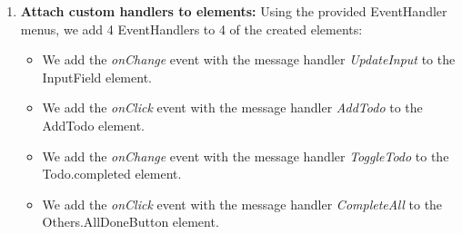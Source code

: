 \begin{enumerate}
\begin{itemize}
\begin{listing}[!htbp]
	\begin{lstlisting}
if (!model.InputField.trim()) return model;
return {
  ...model,
  InputField: "",
  Todos: [...model.Todos, {
      text: model.InputField.trim(),
      completed: false
  }]
};
            \end{lstlisting}
\end{listing}
\item \textbf{ToggleTodo:} Using the canvas menu, we type the following JavaScript code into the editor window to create the ToggleTodo message:
\begin{listing}[htbp]
	\caption{Update function case for the ToggleTodo message.}
	\begin{lstlisting}
const todoIndex = 
    parseInt(event.target.closest('li').dataset.index);
const updatedTodos = model.Todos.map((todo, index) =>
  index === todoIndex
    ? {...todo, completed: !todo.completed}
    : todo
);
return {
  ...model,
  Todos: updatedTodos,
  Others: {
    ...model.Others,
    CompletedCount: updatedTodos.filter(todo => todo.completed).length
  }
};
            \end{lstlisting}
\end{listing}[htbp]
\item \textbf{CompleteAll:} Using the canvas menu, we type the following JavaScript code into the editor window to create the CompleteAll message:
\begin{listing}
	\caption{Update function case for the CompleteAll message.}
	\begin{lstlisting}
const allCompleted = model.Todos.map(todo => 
  ({...todo, completed: true}));
  return {
    ...model,
    Todos: allCompleted,
    Others: {
      ...model.Others,
      CompletedCount: allCompleted.length
    }
  };
  \end{lstlisting}
\end{listing}
\end{itemize}

\item \textbf{Attach custom handlers to elements:} Using the provided EventHandler menus, we add 4 EventHandlers to 4 of the created elements:
\begin{itemize}
	\item We add the \emph{onChange} event with the message handler \emph{UpdateInput} to the InputField element.
	\item We add the \emph{onClick} event with the message handler \emph{AddTodo} to the AddTodo element.
	\item We add the \emph{onChange} event with the message handler \emph{ToggleTodo} to the Todo.completed element.
	\item We add the \emph{onClick} event with the message handler \emph{CompleteAll} to the Others.AllDoneButton element.
\end{itemize}
\end{enumerate}
\medskip
